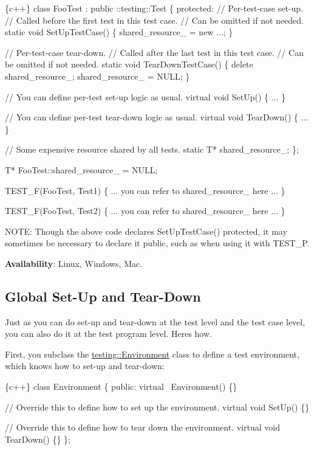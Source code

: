 \begin{DoxyCode}
\{c++\}
class FooTest : public ::testing::Test \{
 protected:
  // Per-test-case set-up.
  // Called before the first test in this test case.
  // Can be omitted if not needed.
  static void SetUpTestCase() \{
    shared\_resource\_ = new ...;
  \}

  // Per-test-case tear-down.
  // Called after the last test in this test case.
  // Can be omitted if not needed.
  static void TearDownTestCase() \{
    delete shared\_resource\_;
    shared\_resource\_ = NULL;
  \}

  // You can define per-test set-up logic as usual.
  virtual void SetUp() \{ ... \}

  // You can define per-test tear-down logic as usual.
  virtual void TearDown() \{ ... \}

  // Some expensive resource shared by all tests.
  static T* shared\_resource\_;
\};

T* FooTest::shared\_resource\_ = NULL;

TEST\_F(FooTest, Test1) \{
  ... you can refer to shared\_resource\_ here ...
\}

TEST\_F(FooTest, Test2) \{
  ... you can refer to shared\_resource\_ here ...
\}
\end{DoxyCode}


N\+O\+TE\+: Though the above code declares {\ttfamily Set\+Up\+Test\+Case()} protected, it may sometimes be necessary to declare it public, such as when using it with {\ttfamily T\+E\+S\+T\+\_\+P}.

{\bfseries Availability}\+: Linux, Windows, Mac.

\subsection*{Global Set-\/\+Up and Tear-\/\+Down}

Just as you can do set-\/up and tear-\/down at the test level and the test case level, you can also do it at the test program level. Here\textquotesingle{}s how.

First, you subclass the {\ttfamily \mbox{\hyperlink{classtesting_1_1_environment}{testing\+::\+Environment}}} class to define a test environment, which knows how to set-\/up and tear-\/down\+:


\begin{DoxyCode}
\{c++\}
class Environment \{
 public:
  virtual ~Environment() \{\}

  // Override this to define how to set up the environment.
  virtual void SetUp() \{\}

  // Override this to define how to tear down the environment.
  virtual void TearDown() \{\}
\};
\end{DoxyCode}


